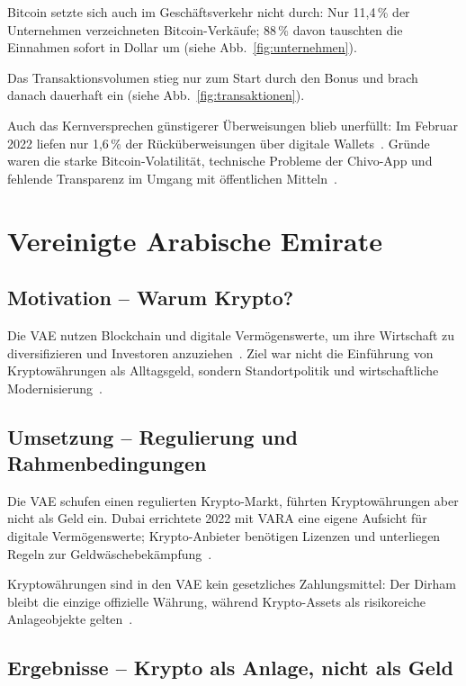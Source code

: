 Bitcoin setzte sich auch im Geschäftsverkehr nicht durch: Nur 11,4\,\% der Unternehmen verzeichneten Bitcoin-Verkäufe; 88\,\% davon tauschten die Einnahmen sofort in Dollar um \cite{Alvarez2023} (siehe Abb.~\ref{fig:unternehmen}).

Das Transaktionsvolumen stieg nur zum Start durch den Bonus und brach danach dauerhaft ein (siehe Abb.~\ref{fig:transaktionen}).

Auch das Kernversprechen günstigerer Überweisungen blieb unerfüllt: Im Februar 2022 liefen nur 1,6\,\% der Rücküberweisungen über digitale Wallets~\cite{Alvarez2023}. Gründe waren die starke Bitcoin-Volatilität, technische Probleme der Chivo-App und fehlende Transparenz im Umgang mit öffentlichen Mitteln~\cite{Alvarez2023}.

\section{Vereinigte Arabische Emirate}
 
\subsection{Motivation -- Warum Krypto?}
 
Die VAE nutzen Blockchain und digitale Vermögenswerte, um ihre Wirtschaft zu diversifizieren und Investoren anzuziehen~\cite{AlTawil2023}. Ziel war nicht die Einführung von Kryptowährungen als Alltagsgeld, sondern Standortpolitik und wirtschaftliche Modernisierung~\cite{DubaiBlockchain2020}.
 
\subsection{Umsetzung -- Regulierung und Rahmenbedingungen}
 
Die VAE schufen einen regulierten Krypto-Markt, führten Kryptowährungen aber nicht als Geld ein. Dubai errichtete 2022 mit VARA eine eigene Aufsicht für digitale Vermögenswerte; Krypto-Anbieter benötigen Lizenzen und unterliegen Regeln zur Geldwäschebekämpfung~\cite{VARA2025, ElGheriani2025, AlTawil2023}.
 
Kryptowährungen sind in den VAE kein gesetzliches Zahlungsmittel: Der Dirham bleibt die einzige offizielle Währung, während Krypto-Assets als risikoreiche Anlageobjekte gelten~\cite{CBUAE2025}.
 
\subsection{Ergebnisse -- Krypto als Anlage, nicht als Geld}
 
